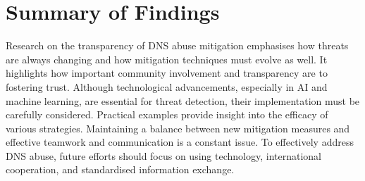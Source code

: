 \section{Summary of Findings}

Research on the transparency of DNS abuse mitigation emphasises how threats are always changing and how mitigation techniques must evolve as well. It highlights how important community involvement and transparency are to fostering trust. Although technological advancements, especially in AI and machine learning, are essential for threat detection, their implementation must be carefully considered. Practical examples provide insight into the efficacy of various strategies. Maintaining a balance between new mitigation measures and effective teamwork and communication is a constant issue. To effectively address DNS abuse, future efforts should focus on using technology, international cooperation, and standardised information exchange.






















